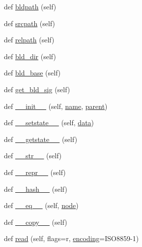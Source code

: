 \begin{DoxyCompactItemize}
\item 
def \hyperlink{classwaflib_1_1_node_1_1_node_a1e67abe7b66ef0abd91795547e14a7b7}{bldpath} (self)
\item 
def \hyperlink{classwaflib_1_1_node_1_1_node_a135bd20c340d064fb59d2c8f329fec50}{srcpath} (self)
\item 
def \hyperlink{classwaflib_1_1_node_1_1_node_a4bc57e86dc18da4ce8fc9a669a829186}{relpath} (self)
\item 
def \hyperlink{classwaflib_1_1_node_1_1_node_ae2103a3fade78458d40298173d7179a3}{bld\+\_\+dir} (self)
\item 
def \hyperlink{classwaflib_1_1_node_1_1_node_a56b26245067bfe835f32199e74135a8a}{bld\+\_\+base} (self)
\item 
def \hyperlink{classwaflib_1_1_node_1_1_node_a804270edff72f7bc520841fa60a494e4}{get\+\_\+bld\+\_\+sig} (self)
\item 
def \hyperlink{classwaflib_1_1_node_1_1_node_acf6238a6107f9c667ddd3aee5b30c626}{\+\_\+\+\_\+init\+\_\+\+\_\+} (self, \hyperlink{lib_2expat_8h_a1b49b495b59f9e73205b69ad1a2965b0}{name}, \hyperlink{classwaflib_1_1_node_1_1_node_a2136fddf4c5e98dc8d1661bee03e725c}{parent})
\item 
def \hyperlink{classwaflib_1_1_node_1_1_node_ae1ce2af534851b1b56bc257f486be757}{\+\_\+\+\_\+setstate\+\_\+\+\_\+} (self, \hyperlink{lib_2expat_8h_ac39e72a1de1cb50dbdc54b08d0432a24}{data})
\item 
def \hyperlink{classwaflib_1_1_node_1_1_node_a5f7b73ba50d8a67499518eacf1946689}{\+\_\+\+\_\+getstate\+\_\+\+\_\+} (self)
\item 
def \hyperlink{classwaflib_1_1_node_1_1_node_aea11f410459c73450de99bd614222100}{\+\_\+\+\_\+str\+\_\+\+\_\+} (self)
\item 
def \hyperlink{classwaflib_1_1_node_1_1_node_a312e0f3ae404d593e43dc8afd8965de9}{\+\_\+\+\_\+repr\+\_\+\+\_\+} (self)
\item 
def \hyperlink{classwaflib_1_1_node_1_1_node_ad2272ed88f10bb1e6e2f473ec38fa5a4}{\+\_\+\+\_\+hash\+\_\+\+\_\+} (self)
\item 
def \hyperlink{classwaflib_1_1_node_1_1_node_a2fce3a217e2e7ef6192cb2e5e0671a4c}{\+\_\+\+\_\+eq\+\_\+\+\_\+} (self, \hyperlink{structnode}{node})
\item 
def \hyperlink{classwaflib_1_1_node_1_1_node_ac6b216662a82357074bf7508a313ac06}{\+\_\+\+\_\+copy\+\_\+\+\_\+} (self)
\item 
def \hyperlink{classwaflib_1_1_node_1_1_node_a05c37e221931a32e74bd11e2dbb38431}{read} (self, flags=\textquotesingle{}r\textquotesingle{}, \hyperlink{structencoding}{encoding}=\textquotesingle{}I\+S\+O8859-\/1\textquotesingle{})

\end{DoxyCompactItemize}
